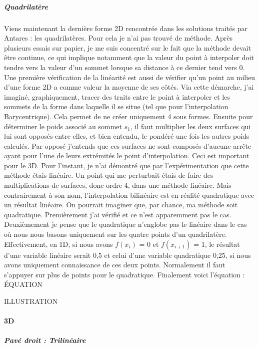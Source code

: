 \subparagraph{Quadrilatère}

Viens maintenant la dernière forme 2D rencontrée dans les solutions traités par Antares : les quadrilatères. Pour cela je n'ai pas trouvé de méthode. Après plusieurs essais sur papier, je me suis concentré sur le fait que la méthode devait être continue, ce qui implique notamment que la valeur du point à interpoler doit tendre vers la valeur d'un sommet lorsque sa distance à ce dernier tend vers 0. Une première vérification de la linéarité est aussi de vérifier qu'un point au milieu d'une forme 2D a comme valeur la moyenne de ses côtés.
Via cette démarche, j'ai imaginé, graphiquement, tracer des traits entre le point à interpoler et les sommets de la forme dans laquelle il se situe (tel que pour l'interpolation Barycentrique). Cela permet de ne créer uniquement 4 sous formes. Ensuite pour déterminer le poids associé au sommet \( s_1 \), il faut multiplier les deux surfaces qui lui sont opposés entre elles, et bien entendu, le pondéré une fois les autres poids calculés. Par opposé j'entends que ces surfaces ne sont composés d'aucune arrête ayant pour l'une de leurs extrémités le point d'interpolation. Ceci est important pour le 3D. Pour l'instant, je n'ai démontré que par l'expérimentation que cette méthode étais linéaire. Un point qui me perturbait étais de faire des multiplications de surfaces, donc ordre 4, dans une méthode linéaire. Mais contrairement à son nom, l'interpolation bilinéaire est en réalité quadratique avec un résultat linéaire. On pourrait imaginer que, par chance, ma méthode soit quadratique. Premièrement j'ai vérifié et ce n'est apparemment pas le cas. Deuxièmement je pense que le quadratique n'englobe pas le linéaire dans le cas où nous nous basons uniquement sur les quatre points d'un quadrilatère. Effectivement, en 1D, si nous avons \(f(x_i)\) = 0 et \(f(x_{i+1})\) = 1, le résultat d'une variable linéaire serait 0,5 et celui d'une variable quadratique 0,25, si nous avons uniquement connaissance de ces deux points. Normalement il faut s'appuyer sur plus de points pour le quadratique. Finalement voici l'équation :\\
ÉQUATION

ILLUSTRATION\vspace{0.5cm}  %


\paragraph{3D}
\subparagraph{Pavé droit : Trilinéaire}

